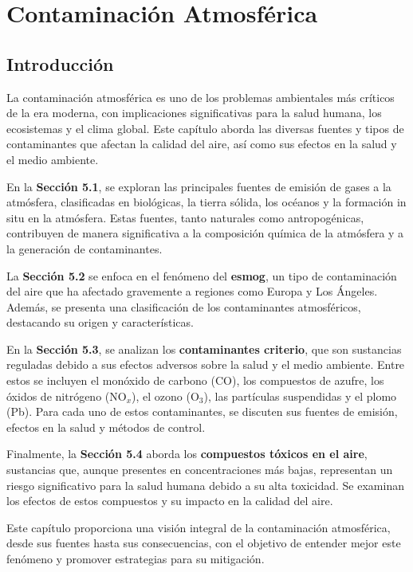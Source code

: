 \chapter{Contaminaci\'on Atmosf\'erica}
\section*{Introducción}

La contaminación atmosférica es uno de los problemas ambientales más críticos de la era moderna, con implicaciones significativas para la salud humana, los ecosistemas y el clima global. Este capítulo aborda las diversas fuentes y tipos de contaminantes que afectan la calidad del aire, así como sus efectos en la salud y el medio ambiente. 

En la \textbf{Sección 5.1}, se exploran las principales fuentes de emisión de gases a la atmósfera, clasificadas en biológicas, la tierra sólida, los océanos y la formación in situ en la atmósfera. Estas fuentes, tanto naturales como antropogénicas, contribuyen de manera significativa a la composición química de la atmósfera y a la generación de contaminantes.

La \textbf{Sección 5.2} se enfoca en el fenómeno del \textbf{esmog}, un tipo de contaminación del aire que ha afectado gravemente a regiones como Europa y Los Ángeles. Además, se presenta una clasificación de los contaminantes atmosféricos, destacando su origen y características.

En la \textbf{Sección 5.3}, se analizan los \textbf{contaminantes criterio}, que son sustancias reguladas debido a sus efectos adversos sobre la salud y el medio ambiente. Entre estos se incluyen el monóxido de carbono (CO), los compuestos de azufre, los óxidos de nitrógeno (NO$_x$), el ozono (O$_3$), las partículas suspendidas y el plomo (Pb). Para cada uno de estos contaminantes, se discuten sus fuentes de emisión, efectos en la salud y métodos de control.

Finalmente, la \textbf{Sección 5.4} aborda los \textbf{compuestos tóxicos en el aire}, sustancias que, aunque presentes en concentraciones más bajas, representan un riesgo significativo para la salud humana debido a su alta toxicidad. Se examinan los efectos de estos compuestos y su impacto en la calidad del aire.

Este capítulo proporciona una visión integral de la contaminación atmosférica, desde sus fuentes hasta sus consecuencias, con el objetivo de entender mejor este fenómeno y promover estrategias para su mitigación.

